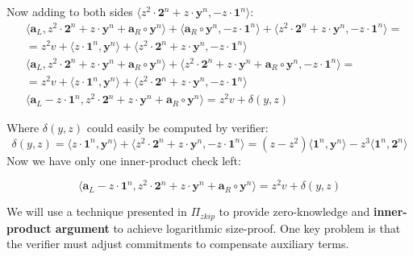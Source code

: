 \documentclass[../lecture-notes-148x210.tex]{subfiles}
\begin{document}
Now adding to both sides $\langle z^2 \cdot \mathbf{2}^n + z \cdot \mathbf{y}^n, - z \cdot \mathbf{1}^n \rangle$:
\begin{equation*}
    \begin{aligned}
        & \langle \mathbf{a}_L, z^2 \cdot \mathbf{2}^n + z \cdot \mathbf{y}^n + \mathbf{a}_R \circ \mathbf{y}^n\rangle + \langle \mathbf{a}_R \circ \mathbf{y}^n, - z \cdot \mathbf{1}^n \rangle + \boxed{\langle z^2 \cdot \mathbf{2}^n + z \cdot \mathbf{y}^n, - z \cdot \mathbf{1}^n \rangle} = \\
        & = z^2v + \langle z \cdot \mathbf{1}^n, \mathbf{y}^n \rangle + \boxed{\langle z^2 \cdot \mathbf{2}^n + z \cdot \mathbf{y}^n, - z \cdot \mathbf{1}^n \rangle} \\
        & \langle \mathbf{a}_L, z^2 \cdot \mathbf{2}^n + z \cdot \mathbf{y}^n + \mathbf{a}_R \circ \mathbf{y}^n\rangle + \boxed{\langle z^2 \cdot \mathbf{2}^n + z \cdot \mathbf{y}^n + \mathbf{a}_R \circ \mathbf{y}^n, - z \cdot \mathbf{1}^n \rangle} = \\
        & = z^2v + \boxed{\langle z \cdot \mathbf{1}^n, \mathbf{y}^n \rangle + \langle z^2 \cdot \mathbf{2}^n + z \cdot \mathbf{y}^n, - z \cdot \mathbf{1}^n \rangle} \\
        & \langle \mathbf{a}_L - z \cdot \mathbf{1}^n, z^2 \cdot \mathbf{2}^n + z \cdot \mathbf{y}^n + \mathbf{a}_R \circ \mathbf{y}^n\rangle = z^2v + \boxed{\delta(y,z)}
    \end{aligned}
\end{equation*}

Where $\delta(y,z)$ could easily be computed by verifier:
$$\delta(y,z) = \langle z \cdot \mathbf{1}^n, \mathbf{y}^n \rangle + \langle z^2 \cdot \mathbf{2}^n + z \cdot \mathbf{y}^n, - z \cdot \mathbf{1}^n \rangle = (z-z^2)\langle \mathbf{1}^n, \mathbf{y}^n \rangle - z^3 \langle \mathbf{1}^n, \mathbf{2}^n \rangle $$
Now we have only one inner-product check left:

\begin{equation}
    \langle \mathbf{a}_L - z \cdot \mathbf{1}^n, z^2 \cdot \mathbf{2}^n + z \cdot \mathbf{y}^n + \mathbf{a}_R \circ \mathbf{y}^n\rangle = z^2v + \delta(y,z)
    \label{eq:inner_product_check}
\end{equation}

We will use a technique presented in $\Pi_{zkip}$ to provide zero-knowledge and \textbf{inner-product argument} to achieve logarithmic size-proof. One key problem is that the verifier must adjust commitments to compensate auxiliary terms.
\end{document}
